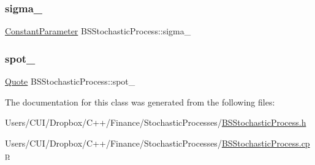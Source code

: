 \hypertarget{class_b_s_stochastic_process_a4d1125a7ed9bd09380b10160ef4277d5}{}\label{class_b_s_stochastic_process_a4d1125a7ed9bd09380b10160ef4277d5} 
\subsubsection{\texorpdfstring{sigma\+\_\+}{sigma\_}}
{\footnotesize\ttfamily \hyperlink{class_constant_parameter}{Constant\+Parameter} B\+S\+Stochastic\+Process\+::sigma\+\_\+\hspace{0.3cm}{\ttfamily [private]}}

\hypertarget{class_b_s_stochastic_process_ab09ba6f304aa5cef5afb06652c98967d}{}\label{class_b_s_stochastic_process_ab09ba6f304aa5cef5afb06652c98967d} 
\subsubsection{\texorpdfstring{spot\+\_\+}{spot\_}}
{\footnotesize\ttfamily \hyperlink{_name_def_8h_a642a6c5fd87319d922637de0e0bb0305}{Quote} B\+S\+Stochastic\+Process\+::spot\+\_\+\hspace{0.3cm}{\ttfamily [private]}}



The documentation for this class was generated from the following files\+:\begin{DoxyCompactItemize}
\item 
Users/\+C\+U\+I/\+Dropbox/\+C++/\+Finance/\+Stochastic\+Processes/\hyperlink{_b_s_stochastic_process_8h}{B\+S\+Stochastic\+Process.\+h}\item 
Users/\+C\+U\+I/\+Dropbox/\+C++/\+Finance/\+Stochastic\+Processes/\hyperlink{_b_s_stochastic_process_8cpp}{B\+S\+Stochastic\+Process.\+cpp}\end{DoxyCompactItemize}
